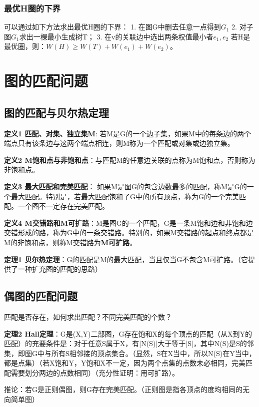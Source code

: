 \documentclass{article}
\begin{document}
\subsubsection{最优H圈的下界}
可以通过如下方法求出最优H圈的下界：
1. 在图G中删去任意一点得到$G_1$
2. 对子图$G_1$求出一棵最小生成树T；
3. 在v的关联边中选出两条权值最小者$e_1,e_2$
若H是最优圈，则：$W(H) \ge W(T) + W(e_1) + W(e_2)$。

\section{图的匹配问题}

\subsection{图的匹配与贝尔热定理}

\textbf{定义1 匹配、对集、独立集M}: 若M是G的一个边子集，如果M中的每条边的两个端点只有该条边与这两个端点相连，则M称为一个匹配或对集或边独立集。

\textbf{定义2 M饱和点与非饱和点}：与匹配M的任意边关联的点称为M饱和点，否则称为非饱和点。

\textbf{定义3 最大匹配和完美匹配}： 如果M是图G的包含边数最多的匹配，称M是G的一个最大匹配。特别是，若最大匹配饱和了G中的所有顶点，称为G的一个完美匹配。一个图不一定存在完美匹配。

\textbf{定义4 M交错路和M可扩路}：M是图G的一个匹配，G是一条M饱和边和非饱和边交错形成的路，称为G中的一条交错路。特别的，如果M交错路的起点和终点都是M的非饱和点，则称M交错路为\textbf{M可扩路}。

\textbf{定理1 贝尔热定理}：G的匹配是M的最大匹配，当且仅当G不包含M可扩路。（它提供了一种扩充图的匹配的思路）

\subsection{偶图的匹配问题}

匹配是否存在，如何求出匹配？不同完美匹配的个数？

\textbf{定理2 Hall定理}：G是(X,Y)二部图，G存在饱和X的每个顶点的匹配（从X到Y的匹配）的充要条件是：对于任意S属于X，有|N(S)|大于等于|S|，其中N(S)是S的邻集，即图G中与所有S相邻接的顶点集合。（显然，S在X当中，所以N(S)在Y当中，都是点集）（若X饱和Y，Y饱和X不一定，因为两个点集的点数未必相同，完美匹配需要划分两边的点数相同）（充分性证明：用可扩路）。

推论：若G是正则偶图，则G存在完美匹配。（正则图是指各顶点的度均相同的无向简单图）
\end{document}
